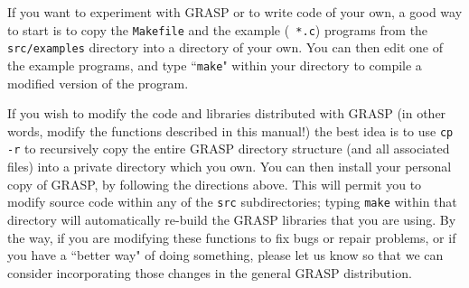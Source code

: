If you want to experiment with GRASP or to write code of your own, a
good way to start is to copy the {\tt Makefile} and the example ({\tt
*.c}) programs from the \mbox{\tt src/examples} directory into a directory
of your own.  You can then edit one of the example programs, and type
``{\tt make}" within your directory to compile a modified version of
the program.

If you wish to modify the code and libraries distributed with GRASP (in
other words, modify the functions described in this manual!) the best
idea is to use {\tt cp -r} to recursively copy the entire GRASP
directory structure (and all associated files) into a private directory
which you own.  You can then install your personal copy of GRASP, by
following the directions above.  This will permit you to modify source
code within any of the {\tt src} subdirectories; typing {\tt make}
within that directory will automatically re-build the GRASP libraries
that you are using.  By the way, if you are modifying these functions
to fix bugs or repair problems, or if you have a ``better way" of doing
something, please let us know so that we can consider incorporating
those changes in the general GRASP distribution.

